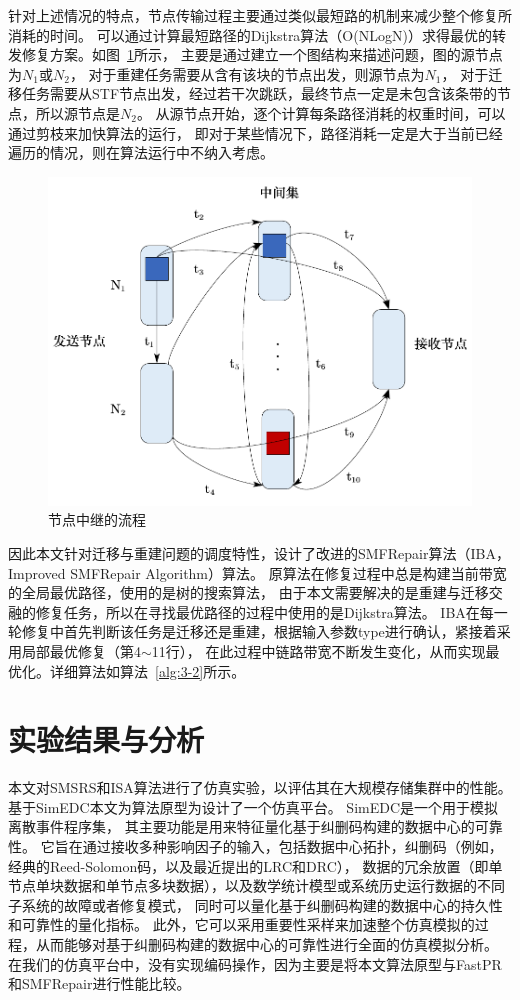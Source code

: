 针对上述情况的特点，节点传输过程主要通过类似最短路的机制来减少整个修复所消耗的时间。
可以通过计算最短路径的Dijkstra算法（O(NLogN)）求得最优的转发修复方案。如图~\ref{fig:3.7}所示，
主要是通过建立一个图结构来描述问题，图的源节点为$N_1$或$N_2$，
对于重建任务需要从含有该块的节点出发，则源节点为$N_1$，
对于迁移任务需要从STF节点出发，经过若干次跳跃，最终节点一定是未包含该条带的节点，所以源节点是$N_2$。
从源节点开始，逐个计算每条路径消耗的权重时间，可以通过剪枝来加快算法的运行，
即对于某些情况下，路径消耗一定是大于当前已经遍历的情况，则在算法运行中不纳入考虑。
\begin{figure}[htbp]
	\centering
	\includegraphics [scale=0.6]{figures/3.7.pdf}
	\caption{节点中继的流程}
	\label{fig:3.7}
\end{figure}


因此本文针对迁移与重建问题的调度特性，设计了改进的SMFRepair算法（IBA，Improved SMFRepair Algorithm）算法。
原算法在修复过程中总是构建当前带宽的全局最优路径，使用的是树的搜索算法，
由于本文需要解决的是重建与迁移交融的修复任务，所以在寻找最优路径的过程中使用的是Dijkstra算法。
IBA在每一轮修复中首先判断该任务是迁移还是重建，根据输入参数type进行确认，紧接着采用局部最优修复（第4$\sim$11行），
在此过程中链路带宽不断发生变化，从而实现最优化。详细算法如算法~\ref{alg:3-2}所示。




\section{实验结果与分析}
本文对SMSRS和ISA算法进行了仿真实验，以评估其在大规模存储集群中的性能。
基于SimEDC\cite{zhang2019simedc}本文为算法原型为设计了一个仿真平台。
SimEDC是一个用于模拟离散事件程序集，
其主要功能是用来特征量化基于纠删码构建的数据中心的可靠性。
它旨在通过接收多种影响因子的输入，包括数据中心拓扑，纠删码（例如，经典的Reed-Solomon码，以及最近提出的LRC和DRC），
数据的冗余放置（即单节点单块数据和单节点多块数据），以及数学统计模型或系统历史运行数据的不同子系统的故障或者修复模式，
同时可以量化基于纠删码构建的数据中心的持久性和可靠性的量化指标。
此外，它可以采用重要性采样来加速整个仿真模拟的过程，从而能够对基于纠删码构建的数据中心的可靠性进行全面的仿真模拟分析。
在我们的仿真平台中，没有实现编码操作，因为主要是将本文算法原型与FastPR和SMFRepair进行性能比较。

